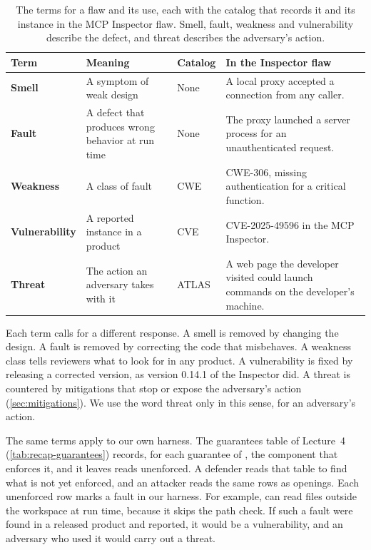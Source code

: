 \begin{table}[tb]
  \caption{The terms for a flaw and its use, each with the catalog that records it and its
  instance in the MCP Inspector flaw. Smell, fault, weakness and vulnerability describe the
  defect, and threat describes the adversary's action.}
  \label{tab:threats-terms}
  \begin{adjustbox}{width=\textwidth}\begin{tabularx}{\textwidth}{L{0.13\textwidth}L{0.27\textwidth}L{0.08\textwidth}X}
    \toprule
    \textbf{Term} & \textbf{Meaning} & \textbf{Catalog} & \textbf{In the Inspector flaw} \\
    \midrule
    \textbf{Smell} & A symptom of weak design & None & A local proxy accepted a connection from any caller. \\
    \textbf{Fault} & A defect that produces wrong behavior at run time & None & The proxy launched a server process for an unauthenticated request. \\
    \textbf{Weakness} & A class of fault & CWE & CWE-306, missing authentication for a critical function. \\
    \textbf{Vulnerability} & A reported instance in a product & CVE & CVE-2025-49596 in the MCP Inspector. \\
    \textbf{Threat} & The action an adversary takes with it & ATLAS & A web page the developer visited could launch commands on the developer's machine. \\
    \bottomrule
  \end{tabularx}\end{adjustbox}
\end{table}

Each term calls for a different response. A smell is removed by changing the design. A fault is
removed by correcting the code that misbehaves. A weakness class tells reviewers what to look for
in any product. A vulnerability is fixed by releasing a corrected version, as version 0.14.1 of the
Inspector did. A threat is countered by mitigations that stop or expose the adversary's action
(\cref{sec:mitigations}). We use the word threat only in this sense, for an adversary's action.

The same terms apply to our own harness. The guarantees table of Lecture~4
(\cref{tab:recap-guarantees}) records, for each guarantee of \msa{}, the component that enforces
it, and it leaves reads unenforced. A defender reads that table to find what is not yet enforced,
and an attacker reads the same rows as openings. Each unenforced row marks a fault in our harness.
For example,  can read files outside the workspace at run time, because it skips
the path check. If such a fault were found in a released product and reported, it would be a
vulnerability, and an adversary who used it would carry out a threat.


